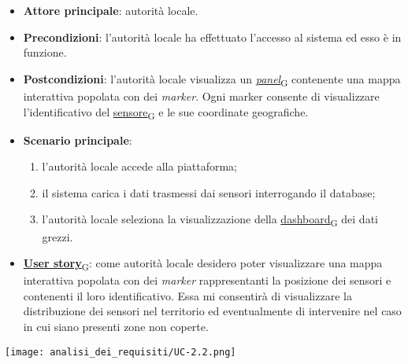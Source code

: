 \newpage
{}
\begin{itemize}
	\item \textbf{Attore principale}: autorità locale.
	\item \textbf{Precondizioni}: l'autorità locale ha effettuato l'accesso al sistema ed esso è in funzione.
	\item \textbf{Postcondizioni}: l'autorità locale visualizza un \href{https://7last.github.io/docs/pb/documentazione-interna/glossario\#panel}{\textit{panel}\textsubscript{G}} contenente una mappa interattiva
	      popolata con dei \textit{marker}. Ogni marker consente di visualizzare l'identificativo del \href{https://7last.github.io/docs/pb/documentazione-interna/glossario\#sensore}{sensore\textsubscript{G}} e le sue coordinate geografiche.
	\item \textbf{Scenario principale}:
	      \begin{enumerate}
		      \item l'autorità locale accede alla piattaforma;
		      \item il sistema carica i dati trasmessi dai sensori interrogando il database;
		      \item l'autorità locale seleziona la visualizzazione della \href{https://7last.github.io/docs/pb/documentazione-interna/glossario\#dashboard}{dashboard\textsubscript{G}} dei dati grezzi.
	      \end{enumerate}
	\item \href{https://7last.github.io/docs/pb/documentazione-interna/glossario\#user-story}{\textbf{User story}\textsubscript{G}}: come autorità locale desidero poter visualizzare una mappa interattiva popolata con dei \textit{marker} rappresentanti
	      la posizione dei sensori e contenenti il loro identificativo. Essa mi consentirà di visualizzare la distribuzione dei sensori nel territorio
	      ed eventualmente di intervenire nel caso in cui siano presenti zone non coperte.
\end{itemize}
\begin{center}
	\texttt{[image: analisi\_dei\_requisiti/UC-2.2.png]}
\end{center}


